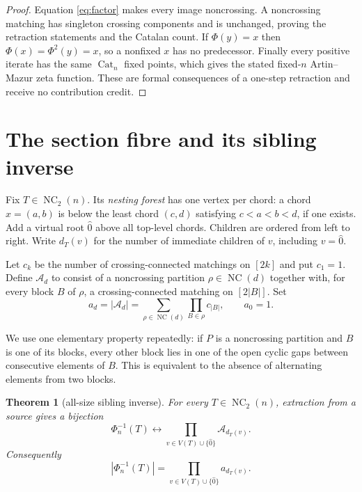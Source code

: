 \documentclass[10pt,a4paper]{amsart}
\newtheorem{theorem}{Theorem}[section]
\theoremstyle{definition}
\theoremstyle{remark}
\newcommand{\NC}{\operatorname{NC}}
\newcommand{\Cat}{\operatorname{Cat}}
\begin{document}
\begin{proof}
Equation \eqref{eq:factor} makes every image noncrossing.  A noncrossing
matching has singleton crossing components and is unchanged, proving the
retraction statements and the Catalan count.  If $\Phi(y)=x$ then
$\Phi(x)=\Phi^2(y)=x$, so a nonfixed $x$ has no predecessor.  Finally every
positive iterate has the same $\Cat_n$ fixed points, which gives the stated
fixed-$n$ Artin--Mazur zeta function.  These are formal consequences of a
one-step retraction and receive no contribution credit.
\end{proof}

\section{The section fibre and its sibling inverse}

Fix $T\in\NC_2(n)$.  Its \emph{nesting forest} has one vertex per chord: a
chord $x=(a,b)$ is below the least chord $(c,d)$ satisfying
$c<a<b<d$, if one exists.  Add a virtual root $\widehat0$ above all
top-level chords.  Children are ordered from left to right.  Write $d_T(v)$
for the number of immediate children of $v$, including $v=\widehat0$.

Let $c_k$ be the number of crossing-connected matchings on $[2k]$ and put
$c_1=1$.  Define $\mathcal A_d$ to consist of a noncrossing partition
$\rho\in\NC(d)$ together with, for every block $B$ of $\rho$, a
crossing-connected matching on $[2|B|]$.  Set
\begin{equation}
 a_d=|\mathcal A_d|
     =\sum_{\rho\in\NC(d)}\prod_{B\in\rho}c_{|B|},
 \qquad a_0=1.                                         \label{eq:ad}
\end{equation}

We use one elementary property repeatedly: if $P$ is a noncrossing
partition and $B$ is one of its blocks, every other block lies in one of the
open cyclic gaps between consecutive elements of $B$.  This is equivalent
to the absence of alternating elements from two blocks.

\begin{theorem}[all-size sibling inverse]\label{thm:inverse}
For every $T\in\NC_2(n)$, extraction from a source gives a bijection
\begin{equation}
 \Phi_n^{-1}(T)
 \longleftrightarrow
 \prod_{v\in V(T)\cup\{\widehat0\}}\mathcal A_{d_T(v)}. \label{eq:bijection}
\end{equation}
Consequently
\begin{equation}
          |\Phi_n^{-1}(T)|
          =\prod_{v\in V(T)\cup\{\widehat0\}}a_{d_T(v)}. \label{eq:fibre}
\end{equation}
\end{theorem}
\end{document}
